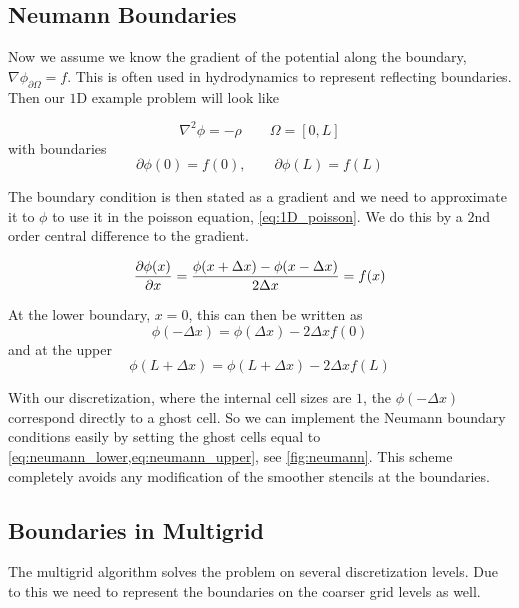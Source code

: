\subsection{Neumann Boundaries}
	Now we assume we know the gradient of the potential along the boundary, \(\nabla\phi_{\partial \Omega} = f\).
	This is often used in hydrodynamics to represent reflecting boundaries.
	Then our \(1\)D example problem will look like

	\begin{equation}
		\nabla^2 \phi = -\rho \qquad \Omega = [0,L] \label{eq:1D_poisson}
	\end{equation}
	with boundaries
	\begin{equation}
		\partial \phi(0) = f(0), \qquad \partial \phi(L) = f(L)
	\end{equation}

	The boundary condition is then stated as a gradient and we need to approximate it
	to \(\phi\) to use it in the poisson equation, \cref{eq:1D_poisson}.
	We do this by a \(2\)nd order central difference to the gradient.

	\begin{equation}
		\pdv{\phi(x)}{x} = \frac{\phi(x +\Delta x ) - \phi(x -\Delta x )}{2\Delta x} = f(x)
	\end{equation}

	At the lower boundary, \(x=0\), this can then be written as
	\begin{equation}
		\phi(-\Delta x) = \phi(\Delta x) - 2\Delta x f(0) \label{eq:neumann_lower}
	\end{equation}
	and at the upper
	\begin{equation}
		\phi(L + \Delta x) = \phi(L + \Delta x) - 2\Delta x f(L) \label{eq:neumann_upper}
	\end{equation}

	With our discretization, where the internal cell sizes are \(1\), the \(\phi(-\Delta x)\)
	correspond directly to a ghost cell. So we can implement the Neumann boundary conditions
	easily by setting the ghost cells equal to \cref{eq:neumann_lower,eq:neumann_upper},
	see \cref{fig:neumann}.
	This scheme completely avoids any modification of the smoother stencils at the boundaries.

	\subsection{Boundaries in Multigrid}
	The multigrid algorithm solves the problem on several discretization levels.
	Due to this we need to represent the boundaries on the coarser grid levels as well.

